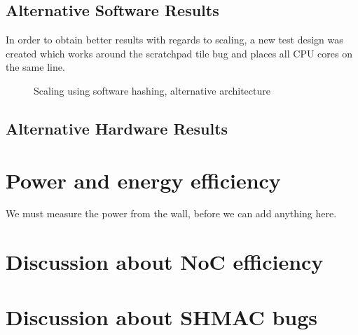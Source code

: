 \subsection{Alternative Software Results}
In order to obtain better results with regards to scaling, a new test design was created which works
around the scratchpad tile bug and places all CPU cores on the same line.

\begin{figure}
	\caption{Scaling using software hashing, alternative architecture}
	\label{fig:sw-scaling2}
\end{figure}

\subsection{Alternative Hardware Results}
\section{Power and energy efficiency}

We must measure the power from the wall, before we can add anything here.

\section{Discussion about NoC efficiency}
\section{Discussion about SHMAC bugs}

